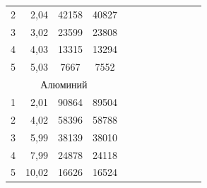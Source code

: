 \begin{enumerate}
\begin{table}[h!]
{\begin{tabular}{|rrcc|rrrllrrr}
					\multicolumn{1}{|r|}{2}                  & \multicolumn{1}{r|}{2,04}    & \multicolumn{1}{c|}{42158} & 40827 &  &  &  &  &  &                       &                                        &                             \\ \cline{1-4}
					\multicolumn{1}{|r|}{3}                  & \multicolumn{1}{r|}{3,02}    & \multicolumn{1}{c|}{23599} & 23808 &  &  &  &  &  &                       &                                        &                             \\ \cline{1-4}
					\multicolumn{1}{|r|}{4}                  & \multicolumn{1}{r|}{4,03}    & \multicolumn{1}{c|}{13315} & 13294 &  &  &  &  &  &                       &                                        &                             \\ \cline{1-4}
					\multicolumn{1}{|r|}{5}                  & \multicolumn{1}{r|}{5,03}    & \multicolumn{1}{c|}{7667}  & 7552  &  &  &  &  &  &                       &                                        &                             \\ \cline{1-4}
					\multicolumn{4}{|c|}{Алюминий}                                                                               &  &  &  &  &  &                       &                                        &                             \\ \cline{1-4}
					\multicolumn{1}{|r|}{1}                  & \multicolumn{1}{r|}{2,01}    & \multicolumn{1}{c|}{90864} & 89504 &  &  &  &  &  &                       &                                        &                             \\ \cline{1-4}
					\multicolumn{1}{|r|}{2}                  & \multicolumn{1}{r|}{4,02}    & \multicolumn{1}{c|}{58396} & 58788 &  &  &  &  &  &                       &                                        &                             \\ \cline{1-4}
					\multicolumn{1}{|r|}{3}                  & \multicolumn{1}{r|}{5,99}    & \multicolumn{1}{c|}{38139} & 38010 &  &  &  &  &  &                       &                                        &                             \\ \cline{1-4}
					\multicolumn{1}{|r|}{4}                  & \multicolumn{1}{r|}{7,99}    & \multicolumn{1}{c|}{24878} & 24118 &  &  &  &  &  &                       &                                        &                             \\ \cline{1-4}
					\multicolumn{1}{|r|}{5}                  & \multicolumn{1}{r|}{10,02}   & \multicolumn{1}{c|}{16626} & 16524 &  &  &  &  &  &                       &                                        &                             \\ \cline{1-4}

\end{tabular}}
\end{table}
\end{enumerate}
